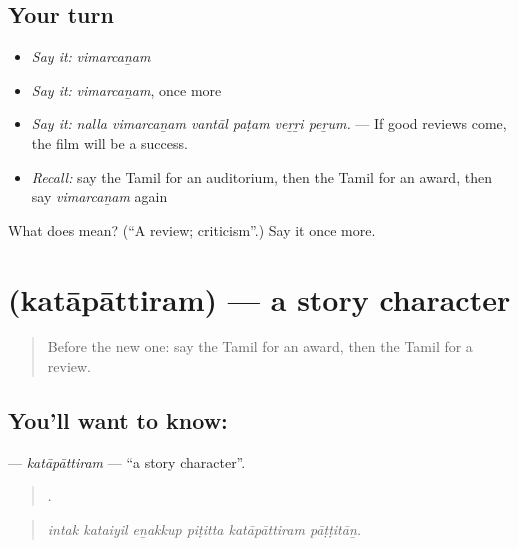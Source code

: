 \subsection*{Your turn}
\begin{itemize}
\raggedright
  \item \emph{Say it:} \emph{vimarcaṉam}
  \item \emph{Say it:} \emph{vimarcaṉam}, once more
  \item \emph{Say it:} \emph{nalla vimarcaṉam vantāl paṭam veṟṟi peṟum.} — If good reviews come, the film will be a success.
  \item \emph{Recall:} say the Tamil for an auditorium, then the Tamil for an award, then say \emph{vimarcaṉam} again
\end{itemize}

\begin{tcolorbox}[breakable,colback=teal!4,colframe=teal!35!black,title={Before you move on}]
What does  mean? (\textquotedblleft{}A review; criticism\textquotedblright{}.) Say it once more.
\end{tcolorbox}
\section[\texorpdfstring{\ta{கதாபாத்திரம்} (katāpāttiram)}{கதாபாத்திரம் (katāpāttiram)}]{ (katāpāttiram) — a story character}

\label{lesson:TA-C555-katapattiram}



\begin{quote}
Before the new one: say the Tamil for an award, then the Tamil for a review.
\end{quote}

\subsection*{You'll want to know: }
\textbf{} — \emph{katāpāttiram} — \textquotedblleft{}a story character\textquotedblright{}.

\begin{quote}
     .
\end{quote}

\begin{quote}
\emph{intak kataiyil eṉakkup piṭitta katāpāttiram pāṭṭitāṉ.}
\end{quote}


